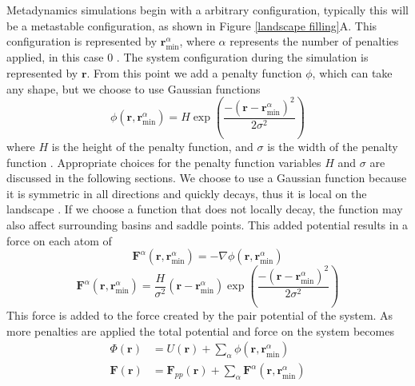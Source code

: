 Metadynamics simulations begin with a arbitrary configuration, typically this will be a metastable configuration, as shown in Figure \ref{landscape filling}A.  This configuration is represented by $\mathbf{r}_{\min}^\alpha$, where $\alpha$ represents the number of penalties applied, in this case 0 \cite{Kushima2009, Kushima2009a}.  The system configuration during the simulation is represented by $\mathbf{r}$.  From this point we add a penalty function $\phi$, which can take any shape, but we choose to use Gaussian functions
\begin{equation}
\phi(\mathbf{r},\mathbf{r}_{\min}^\alpha) = H\exp\left(\frac{-\left(\mathbf{r} - \mathbf{r}_{\min}^\alpha\right)^2}{2\sigma^2}\right)
\end{equation}
where $H$ is the height of the penalty function, and $\sigma$ is the width of the penalty function \cite{Kushima2009, Kushima2009a}.  Appropriate choices for the penalty function variables $H$ and $\sigma$ are discussed in the following sections.  We choose to use a Gaussian function because it is symmetric in all directions and quickly decays, thus it is local on the landscape \cite{Kushima2009, Kushima2009a}.  If we choose a function that does not locally decay, the function may also affect surrounding basins and saddle points.  This added potential results in a force on each atom of
\begin{equation}
	\mathbf{F}^\alpha(\mathbf{r},\mathbf{r}_{\min}^\alpha) = -\nabla \phi(\mathbf{r},\mathbf{r}_{\min}^\alpha)
\end{equation}
\begin{equation}
	\mathbf{F}^\alpha(\mathbf{r},\mathbf{r}_{\min}^\alpha) = \frac{H}{\sigma^2}\left(\mathbf{r} - \mathbf{r}_{\min}^\alpha\right)\exp\left(\frac{-\left(\mathbf{r} - \mathbf{r}_{\min}^\alpha\right)^2}{2\sigma^2}\right)
\end{equation}
This force is added to the force created by the pair potential of the system.  As more penalties are applied the total potential and force on the system becomes
\begin{equation}
\begin{split}
	\Phi(\mathbf{r}) &= U(\mathbf{r}) + \sum_{\alpha}\phi(\mathbf{r},\mathbf{r}_{\min}^\alpha) \\
	\mathbf{F}(\mathbf{r}) &= \mathbf{F}_{pp}(\mathbf{r}) + \sum_{\alpha}\mathbf{F}^\alpha(\mathbf{r},\mathbf{r}_{\min}^\alpha)
\end{split}
\end{equation}
